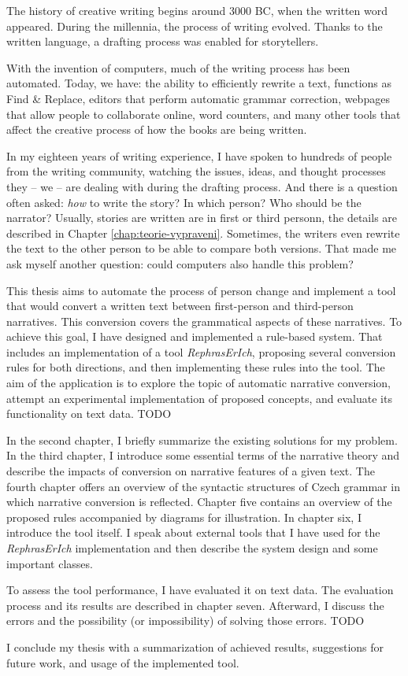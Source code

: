 The history of creative writing begins around 3000 BC, when the written word appeared. During the millennia, the process of writing evolved. Thanks to the written language, a drafting process was enabled for storytellers.

With the invention of computers, much of the writing process has been automated. Today, we have: the ability to efficiently rewrite a text, functions as Find \& Replace, editors that perform automatic grammar correction, webpages that allow people to collaborate online, word counters, and many other tools that affect the creative process of how the books are being written.

In my eighteen years of writing experience, I have spoken to hundreds of people from the writing community, watching the issues, ideas, and thought processes they -- we -- are dealing with during the drafting process. And there is a question often asked: \emph{how} to write the story? In which person? Who should be the narrator? Usually, stories are written are in first or third personn, the details are described in Chapter \ref{chap:teorie-vypraveni}. Sometimes, the writers even rewrite the text to the other person to be able to compare both versions. That made me ask myself another question: could computers also handle this problem?

This thesis aims to automate the process of person change and implement a tool that would convert a written text between first-person and third-person narratives. This conversion covers the grammatical aspects of these narratives. To achieve this goal, I have designed and implemented a rule-based system. That includes an implementation of a tool \emph{RephrasErIch}, proposing several conversion rules for both directions, and then implementing these rules into the tool. The aim of the application is to explore the topic of automatic narrative conversion, attempt an experimental implementation of proposed concepts, and evaluate its functionality on text data. TODO

In the second chapter, I briefly summarize the existing solutions for my problem. In the third chapter, I introduce some essential terms of the narrative theory and describe the impacts of conversion on narrative features of a given text. The fourth chapter offers an overview of the syntactic structures of Czech grammar in which narrative conversion is reflected. Chapter five contains an overview of the proposed rules accompanied by diagrams for illustration. In chapter six, I introduce the tool itself. I speak about external tools that I have used for the \emph{RephrasErIch} implementation and then describe the system design and some important classes.

To assess the tool performance, I have evaluated it on text data. The evaluation process and its results are described in chapter seven. Afterward, I discuss the errors and the possibility (or impossibility) of solving those errors. TODO

I conclude my thesis with a summarization of achieved results, suggestions for future work, and usage of the implemented tool.

